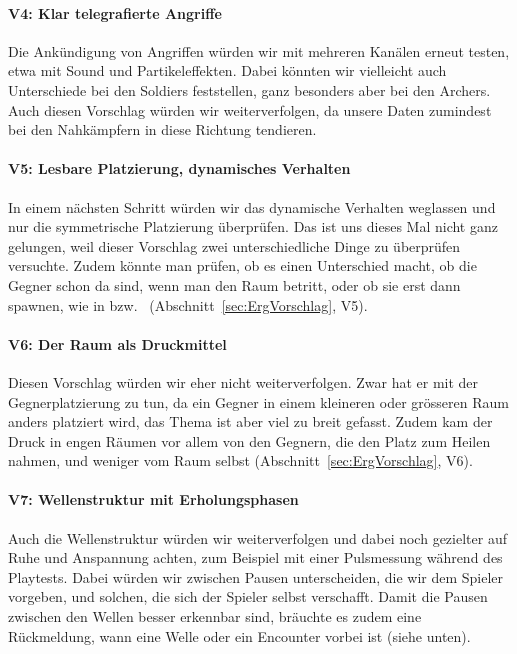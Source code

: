 \documentclass[../Main.tex]{subfiles}
\begin{document}
\paragraph{V4: Klar telegrafierte Angriffe}
Die Ankündigung von Angriffen würden wir mit mehreren Kanälen erneut testen, etwa mit Sound und Partikeleffekten. Dabei könnten wir vielleicht auch Unterschiede bei den Soldiers feststellen, ganz besonders aber bei den Archers. Auch diesen Vorschlag würden wir weiterverfolgen, da unsere Daten zumindest bei den Nahkämpfern in diese Richtung tendieren.

\paragraph{V5: Lesbare Platzierung, dynamisches Verhalten}
In einem nächsten Schritt würden wir das dynamische Verhalten weglassen und nur die symmetrische Platzierung überprüfen. Das ist uns dieses Mal nicht ganz gelungen, weil dieser Vorschlag zwei unterschiedliche Dinge zu überprüfen versuchte. Zudem könnte man prüfen, ob es einen Unterschied macht, ob die Gegner schon da sind, wenn man den Raum betritt, oder ob sie erst dann spawnen, wie in  bzw.\  (Abschnitt~\ref{sec:ErgVorschlag}, V5).

\paragraph{V6: Der Raum als Druckmittel}
Diesen Vorschlag würden wir eher nicht weiterverfolgen. Zwar hat er mit der Gegnerplatzierung zu tun, da ein Gegner in einem kleineren oder grösseren Raum anders platziert wird, das Thema ist aber viel zu breit gefasst. Zudem kam der Druck in engen Räumen vor allem von den Gegnern, die den Platz zum Heilen nahmen, und weniger vom Raum selbst (Abschnitt~\ref{sec:ErgVorschlag}, V6).

\paragraph{V7: Wellenstruktur mit Erholungsphasen}
Auch die Wellenstruktur würden wir weiterverfolgen und dabei noch gezielter auf Ruhe und Anspannung achten, zum Beispiel mit einer Pulsmessung während des Playtests.\autocite[285--287]{drachen2018gamesuserresearch} Dabei würden wir zwischen Pausen unterscheiden, die wir dem Spieler vorgeben, und solchen, die sich der Spieler selbst verschafft. Damit die Pausen zwischen den Wellen besser erkennbar sind, bräuchte es zudem eine Rückmeldung, wann eine Welle oder ein Encounter vorbei ist (siehe unten).
\end{document}
